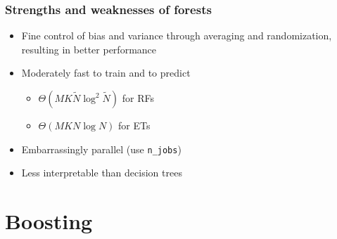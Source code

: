 \documentclass{beamer}
\begin{document}
\begin{frame}
  \frametitle{Strengths and weaknesses of forests}

  \begin{itemize}

    \item {\color{blue}Fine control} of bias and variance through averaging
          and randomization, resulting in {\color{blue} better performance}

    \vspace{0.25cm}

    \item Moderately fast to train and to predict
        \begin{itemize}
            \item $\Theta(MK\widetilde{N}\log^2 \widetilde{N})$ for RFs
            \item $\Theta(MKN\log N)$ for ETs
        \end{itemize}

    \vspace{0.25cm}

    \item Embarrassingly {\color{blue} parallel} (use \texttt{n\_jobs})

    \vspace{0.25cm}

    \item {\color{red} Less interpretable} than decision trees
  \end{itemize}
\end{frame}



\section{Boosting}
\end{document}
